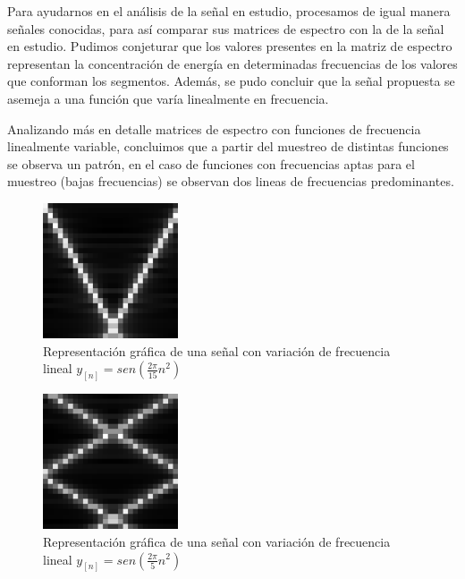 \documentclass{article}
\begin{document}
		Para ayudarnos en el análisis de la señal en estudio, procesamos de igual manera señales conocidas, para así comparar sus matrices de espectro con la de la señal en estudio. Pudimos conjeturar que los valores presentes en la matriz de espectro representan la concentración de 
	        energía en determinadas frecuencias de los valores que conforman los segmentos. Además, se pudo concluir que la señal propuesta 
	        se asemeja a una función que varía linealmente en frecuencia.
	        
	        Analizando más en detalle matrices de espectro con funciones de frecuencia linealmente variable, concluimos que a partir del muestreo de distintas funciones se observa un patrón, en el caso de funciones con frecuencias aptas para el muestreo (bajas frecuencias) se observan dos lineas de frecuencias predominantes. 
	        
	        
	          \begin{figure}[h!]
	            \centering
	            \includegraphics[width=40mm]{variable15}
	            \caption{Representación gráfica de una señal con variación de frecuencia lineal $y_{[n]}= sen(\frac{2\pi}{15}n^2)$ }
	            \label{valor15}
	        \end{figure}
	        
	         \begin{figure}[h!]
	            \centering
	            \includegraphics[width=40mm]{variable5}
	            \caption{Representación gráfica de una señal con variación de frecuencia lineal $y_{[n]} = sen(\frac{2\pi}{5}n^2)$ }
	            \label{valor5}
	        \end{figure}
	
\end{document}

